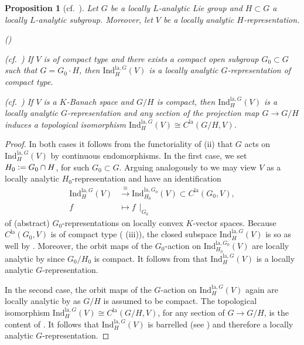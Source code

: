 \documentclass[a4paper, reqno, 10pt]{amsart}
\newtheorem{proposition}[theorem]{Proposition}
\theoremstyle{definition}
\newenvironment{altenumerate}
	{\begin{list}
		{\textup{(\theenumi)} }
		{\usecounter{enumi}
			\setlength{\labelwidth}{0pt}
			\setlength{\labelsep}{0pt}
			\setlength{\leftmargin}{0pt}
			\setlength{\itemsep}{0pt}
			\setlength{\topsep}{0pt}
		\renewcommand{\theenumi}{\roman{enumi}}
		}}
	{\end{list}}
\numberwithin{equation}{section}
\newcommand{\defeq}{\vcentcolon=}
\newcommand{\Ind}{{\mathrm{Ind}}}
\newcommand{\la}{{\mathrm{la}}}
\newcommand{\lra}{\longrightarrow}
\newcommand{\lto}{\longmapsto}
\newcommand{\ra}{\rightarrow}
\newcommand{\res}[1]{{\!\,\mid_{#1}}}
\begin{document}
\begin{proposition}[{cf.\ \cite[Satz 4.1.5]{FeauxdeLacroix99TopDarstpAdischLieGrp}}]\label{Prop 1 - When locally analytic induction is locally analytic representation}
	Let $G$ be a locally $L$-analytic Lie group and $H\subset G$ a locally $L$-analytic subgroup.
	Moreover, let $V$ be a locally analytic $H$-representation.
	\begin{altenumerate}
		\item
		\textnormal{(cf.\ \cite[\S 2.1]{Emerton07JacquetModLocAnRep2})}
		If $V$ is of compact type and there exists a compact open subgroup $G_0 \subset G$ such that $G = G_0 \cdot H$, then $\Ind^{\la,G}_H(V)$ is a locally analytic $G$-representation of compact type.
		\item
		\textnormal{(cf.\ \cite[Satz 4.3.1]{FeauxdeLacroix99TopDarstpAdischLieGrp})}
		If $V$ is a $K$-Banach space and $G/H$ is compact, then $\Ind^{\la,G}_H(V)$ is a locally analytic $G$-representation and any section of the projection map $G \ra G/H$ induces a topological isomorphism $\Ind^{\la,G}_H(V) \cong C^\la(G/H,V)$.
	\end{altenumerate}
\end{proposition}
\begin{proof}
	In both cases it follows from the functoriality of  (ii) that $G$ acts on $\Ind_H^{\la,G}(V)$ by continuous endomorphisms.
	In the first case, we set $H_0 \defeq G_0 \cap H$, for such $G_0\subset G$.
	Arguing analogously to \cite[\S 2.1]{Emerton07JacquetModLocAnRep2} we may view $V$ as a locally analytic $H_0$-representation and have an identification
	\begin{align*}
		\Ind^{\la,G}_H(V) &\overset{\cong}{\lra} \Ind^{\la,G_0}_{H_0}(V) \subset C^\la(G_0,V) , \\
		f &\lto f\res{G_0}
	\end{align*}	
	of (abstract) $G_0$-representations on locally convex $K$-vector spaces.
	Because $C^\la(G_0,V)$ is of compact type ( (iii)), the closed subspace $\Ind^{\la,G}_H(V)$ is so as well by .	
	Moreover, the orbit maps of the $G_0$-action on $\Ind^{\la,G_0}_{H_0}(V)$ are locally analytic by \cite[Satz 4.1.5]{FeauxdeLacroix99TopDarstpAdischLieGrp} since $G_0/H_0$ is compact.
	It follows from  that $\Ind^{\la,G}_H(V)$ is a locally analytic $G$-representation.
	
	
	In the second case, the orbit maps of the $G$-action on $\Ind^{\la,G}_H(V)$ again are locally analytic by \cite[Satz 4.1.5]{FeauxdeLacroix99TopDarstpAdischLieGrp} as $G/H$ is assumed to be compact.
	The topological isomorphism $\Ind^{\la,G}_H(V) \cong C^\la(G/H,V)$, for any section of $G \ra G/H$, is the content of \cite[Satz 4.3.1]{FeauxdeLacroix99TopDarstpAdischLieGrp}.
	It follows that $\Ind^{\la,G}_H(V)$ is barrelled (see ) and therefore a locally analytic $G$-representation.	
\end{proof}
\end{document}
